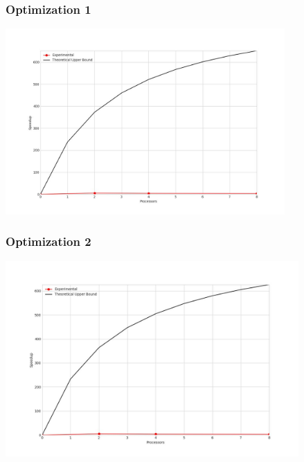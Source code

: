 \subsubsection{Optimization 1}
\begin{center}
    \resizebox{0.95\textwidth}{!}{}
    \includegraphics[width=0.8\textwidth]{../img/speedup-graph_type-random-150000-O1}
\end{center}

\clearpage
\subsubsection{Optimization 2}
\begin{center}
    \resizebox{0.95\textwidth}{!}{}
    \includegraphics[width=0.84\textwidth]{../img/speedup-graph_type-random-150000-O2}
\end{center}

